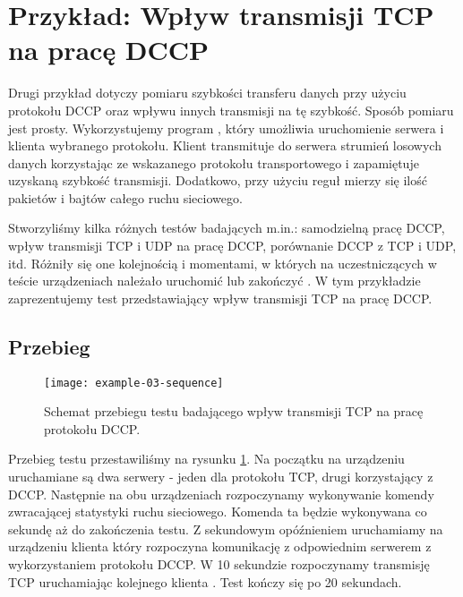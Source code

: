 \documentclass[00-praca-magisterska.tex]{subfiles}
\begin{document}
\section{Przykład: Wpływ transmisji TCP na pracę DCCP}
\label{example-dccp}

Drugi przykład dotyczy pomiaru szybkości transferu danych przy użyciu protokołu
DCCP oraz wpływu innych transmisji na tę szybkość. Sposób pomiaru jest prosty.
Wykorzystujemy program , który umożliwia uruchomienie serwera i
klienta wybranego protokołu. Klient transmituje do serwera strumień losowych
danych korzystając ze wskazanego protokołu transportowego i zapamiętuje uzyskaną
szybkość transmisji. Dodatkowo, przy użyciu reguł  mierzy się
ilość pakietów i bajtów całego ruchu sieciowego.

Stworzyliśmy kilka różnych testów badających m.in.: samodzielną pracę DCCP,
wpływ transmisji TCP i UDP na pracę DCCP, porównanie DCCP z TCP i UDP, itd.
Różniły się one kolejnością i momentami, w których na uczestniczących w teście
urządzeniach należało uruchomić lub zakończyć . W tym przykładzie
zaprezentujemy test przedstawiający wpływ transmisji TCP na pracę DCCP. 

\subsection{Przebieg}

\begin{figure}[htb]
\begin{center}
\leavevmode
\texttt{[image: example-03-sequence]}
\end{center}
\caption{Schemat przebiegu testu badającego wpływ transmisji TCP na pracę
protokołu DCCP.}
\label{fig:example-03-sequence}
\end{figure}

Przebieg testu przestawiliśmy na rysunku \ref{fig:example-03-sequence}. Na
początku na urządzeniu  uruchamiane są dwa serwery  -
jeden dla protokołu TCP, drugi korzystający z DCCP. Następnie na obu
urządzeniach rozpoczynamy wykonywanie komendy  zwracającej
statystyki ruchu sieciowego. Komenda ta będzie wykonywana co sekundę aż do
zakończenia testu. Z sekundowym opóźnieniem uruchamiamy na urządzeniu
 klienta  który rozpoczyna komunikację z odpowiednim
serwerem z wykorzystaniem protokołu DCCP. W 10 sekundzie rozpoczynamy transmisję
TCP uruchamiając kolejnego klienta . Test kończy się po 20
sekundach.
\end{document}
